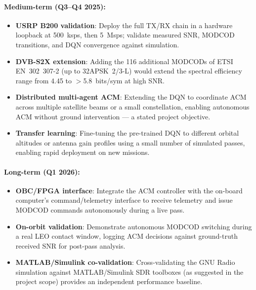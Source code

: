 \documentclass[12pt,a4paper]{report}
\begin{document}
\paragraph{Medium-term (Q3--Q4 2025):}
\begin{itemize}[nosep]
    \item \textbf{USRP B200 validation}: Deploy the full TX/RX chain in
          a hardware loopback at 500~ksps, then 5~Msps; validate measured
          SNR, MODCOD transitions, and DQN convergence against simulation.
    \item \textbf{DVB-S2X extension}: Adding the 116 additional MODCODs of
          ETSI EN~302~307-2 (up to 32APSK~2/3-L) would extend the spectral
          efficiency range from 4.45 to $>$5.8~bits/sym at high SNR.
    \item \textbf{Distributed multi-agent ACM}: Extending the DQN to
          coordinate ACM across multiple satellite beams or a small
          constellation, enabling autonomous ACM without ground intervention
          --- a stated project objective.
    \item \textbf{Transfer learning}: Fine-tuning the pre-trained DQN to
          different orbital altitudes or antenna gain profiles using a small
          number of simulated passes, enabling rapid deployment on new missions.
\end{itemize}

\paragraph{Long-term (Q1 2026):}
\begin{itemize}[nosep]
    \item \textbf{OBC/FPGA interface}: Integrate the ACM controller with the
          on-board computer's command/telemetry interface to receive telemetry
          and issue MODCOD commands autonomously during a live pass.
    \item \textbf{On-orbit validation}: Demonstrate autonomous MODCOD switching
          during a real LEO contact window, logging ACM decisions against
          ground-truth received SNR for post-pass analysis.
    \item \textbf{MATLAB/Simulink co-validation}: Cross-validating the GNU
          Radio simulation against MATLAB/Simulink SDR toolboxes (as suggested
          in the project scope) provides an independent performance baseline.
\end{itemize}

\appendix
\end{document}
